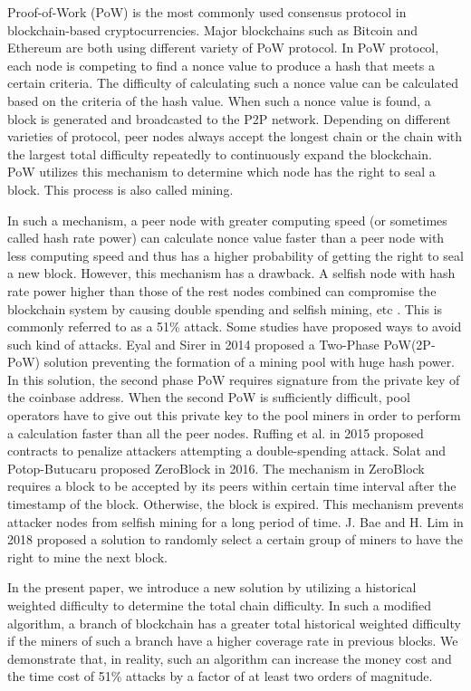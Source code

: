 \documentclass[conference]{IEEEtran}
\begin{document}
Proof-of-Work (PoW) is the most commonly used consensus protocol in blockchain-based cryptocurrencies. Major blockchains such as Bitcoin and Ethereum are both using different variety of PoW protocol. In PoW protocol, each node is competing to find a nonce value to produce a hash that meets a certain criteria. The difficulty of calculating such a nonce value can be calculated based on the criteria of the hash value. When such a nonce value is found, a block is generated and broadcasted to the P2P network. Depending on different varieties of protocol, peer nodes always accept the longest chain or the chain with the largest total difficulty repeatedly to continuously expand the blockchain. PoW utilizes this mechanism to determine which node has the right to seal a block. This process is also called mining.

In such a mechanism, a peer node with greater computing speed (or sometimes called hash rate power) can calculate nonce value faster than a peer node with less computing speed and thus has a higher probability of getting the right to seal a new block. However, this mechanism has a drawback. A selfish node with hash rate power higher than those of the rest nodes combined can compromise the blockchain system by causing double spending and selfish mining, etc \cite{b3}\cite{b4}. This is commonly referred to as a 51\% attack. Some studies have proposed ways to avoid such kind of attacks. Eyal and Sirer \cite{b5} in 2014 proposed a Two-Phase PoW(2P-PoW) solution preventing the formation of a mining pool with huge hash power. In this solution, the second phase PoW requires signature from the private key of the coinbase address. When the second PoW is sufficiently difficult, pool operators have to give out this private key to the pool miners in order to perform a calculation faster than all the peer nodes. Ruffing et al. \cite{b6} in 2015 proposed contracts to penalize attackers attempting a double-spending attack. Solat and Potop-Butucaru proposed ZeroBlock \cite{b7} in 2016. The mechanism in ZeroBlock requires a block to be accepted by its peers within certain time interval after the timestamp of the block. Otherwise, the block is expired. This mechanism prevents attacker nodes from selfish mining for a long period of time. J. Bae and H. Lim \cite{b8} in 2018 proposed a solution to randomly select a certain group of miners to have the right to mine the next block.

In the present paper, we introduce a new solution by utilizing a historical weighted difficulty to determine the total chain difficulty. In such a modified algorithm, a branch of blockchain has a greater total historical weighted difficulty if the miners of such a branch have a higher coverage rate in previous blocks. We demonstrate that, in reality, such an algorithm can increase the money cost and the time cost of 51\% attacks by a factor of at least two orders of magnitude.
\end{document}
